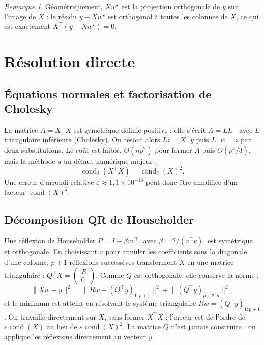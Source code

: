 \documentclass[11pt,a4paper]{article}
\theoremstyle{remark}
\newtheorem*{remarque}{Remarque}
\DeclareMathOperator{\cond}{cond}
\begin{document}
\begin{remarque}
Géométriquement, $Xw^\star$ est la projection orthogonale de $y$ sur l'image de $X$ : le résidu $y - Xw^\star$ est orthogonal à toutes les colonnes de $X$, ce qui est exactement $X^\top(y - Xw^\star) = 0$.
\end{remarque}

\section{Résolution directe}

\subsection{Équations normales et factorisation de Cholesky}

La matrice $A = X^\top X$ est symétrique définie positive : elle s'écrit $A = LL^\top$ avec $L$ triangulaire inférieure (Cholesky). On résout alors $Lz = X^\top y$ puis $L^\top w = z$ par deux substitutions. Le coût est faible, $O(np^2)$ pour former $A$ puis $O(p^3/3)$, mais la méthode a un défaut numérique majeur :
\[
  \cond_2(X^\top X) = \cond_2(X)^2 .
\]
Une erreur d'arrondi relative $\varepsilon \approx 1{,}1\times10^{-16}$ peut donc être amplifiée d'un facteur $\cond(X)^2$.

\subsection{Décomposition QR de Householder}

Une réflexion de Householder $P = I - \beta vv^\top$, avec $\beta = 2/(v^\top v)$, est symétrique et orthogonale. En choisissant $v$ pour annuler les coefficients sous la diagonale d'une colonne, $p+1$ réflexions successives transforment $X$ en une matrice triangulaire : $Q^\top X = \begin{pmatrix} R \\ 0 \end{pmatrix}$. Comme $Q$ est orthogonale, elle conserve la norme :
\[
  \lVert Xw - y\rVert^2 = \lVert Rw - (Q^\top y)_{1:p+1}\rVert^2 + \lVert (Q^\top y)_{p+2:n}\rVert^2 ,
\]
et le minimum est atteint en résolvant le système triangulaire $Rw = (Q^\top y)_{1:p+1}$. On travaille directement sur $X$, sans former $X^\top X$ : l'erreur est de l'ordre de $\varepsilon \cond(X)$ au lieu de $\varepsilon \cond(X)^2$. La matrice $Q$ n'est jamais construite : on applique les réflexions directement au vecteur $y$.
\end{document}
